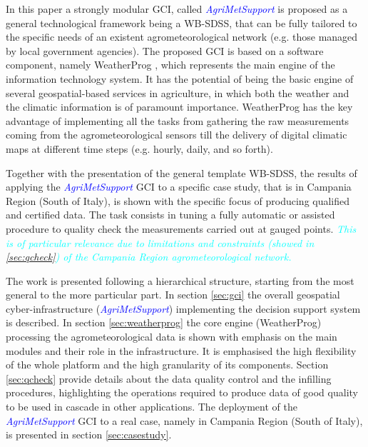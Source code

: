 \documentclass[authoryear,preprint,review,12pt]{elsarticle}
\newcommand{\update}[1]{\emph{\textcolor{blue}{#1}}}
\newcommand{\review}[1]{\emph{\textcolor{cyan}{#1}}}
\newcommand{\gci}{\update{AgriMetSupport}\xspace}
\begin{document}
In this paper a strongly modular GCI, called \gci
is proposed as a general technological framework being a WB-SDSS, that can be fully tailored to the specific needs of an existent agrometeorological network (e.g. those managed by local government agencies).
The proposed GCI is based on a software component, namely WeatherProg \citep{langella:weatherprog2014,langella:weatherprog2016}, which represents the main engine of the information technology system.
It has the potential of being the basic engine of several geospatial-based services in agriculture, in which both the weather and the climatic information is of paramount importance.
WeatherProg has the key advantage of implementing all the tasks from gathering the raw measurements coming from the agrometeorological sensors till the delivery of digital climatic maps at different time steps (e.g. hourly, daily, and so forth).

Together with the presentation of the general template WB-SDSS, the results of applying the \gci GCI to a specific case study, that is in Campania Region (South of Italy), is shown with the specific focus of producing qualified and certified data.
The task consists in tuning a fully automatic or assisted procedure to quality check the measurements carried out at gauged points.
\review{This is of particular relevance due to limitations and constraints (showed in \cref{sec:qcheck}) of the Campania Region agrometeorological network.}

The work is presented following a hierarchical structure, starting from the most general to the more particular part.
In section \ref{sec:gci} the overall geospatial cyber-infrastructure (\gci) implementing the decision support system is described.
In section \ref{sec:weatherprog} the core engine (WeatherProg) processing the agrometeorological data is shown with emphasis on the main modules and their role in the infrastructure.
It is emphasised the high flexibility of the whole platform and the high granularity of its components.
Section \ref{sec:qcheck} provide details about the data quality control and the infilling procedures, highlighting the operations required to produce data of good quality to be used in cascade in other 
applications.
The deployment of the \gci GCI to a real case, namely in Campania Region (South of Italy), is presented in section \ref{sec:casestudy}.
\end{document}
